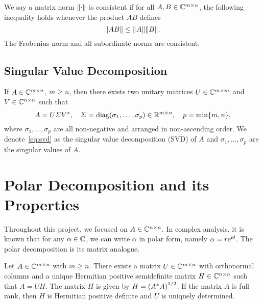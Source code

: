 \documentclass[12pt]{article}
\begin{document}
We say a matrix norm $\|{\cdot}\|$ is consistent if for all $A,B\in\mathbb{C}^{m\times n}$, the following inequality holds whenever the product $AB$ defines 
\begin{equation}
    \notag 
    \|{AB}\| \leq \|{A}\|\|{B}\|.
\end{equation}
The Frobenius norm and all subordinate norms are consistent.

\subsection{Singular Value Decomposition}\label{subsec:svd}
\begin{theorem}
    \label{thm:svd}
    If $A\in\mathbb{C}^{m\times n}$, $m\geq n$, then there exists two unitary matrices $U\in\mathbb{C}^{m\times m}$ and $V\in\mathbb{C}^{n\times n}$ such that 
    \begin{equation}\label{eq:svd}
        A = U\varSigma V^*,\quad \varSigma = \mathrm{diag}(\sigma_1,\dots,\sigma_p)\in\mathbb{R}^{m\times n},\quad p = \min\{m,n\},
    \end{equation}
    where $\sigma_1,\dots,\sigma_p$ are all non-negative and arranged in non-ascending order. We denote~\eqref{eq:svd} as the singular value decomposition (SVD) of $A$ and $\sigma_1,\dots,\sigma_p$ are the singular values of $A$.
\end{theorem}





\section{Polar Decomposition and its Properties}\label{sec:polar-properties}

Throughout this project, we focused on $A\in\mathbb{C}^{n\times n}$. In complex analysis, it is known that for any $\alpha\in\mathbb{C}$, we can write $\alpha$ in polar form, namely $\alpha = r\mathrm{e}^{\mathrm{i} \theta}$. The polar decomposition is its matrix analogue.

\begin{theorem}
     \label{def:matrix-norm}
    Let $A\in\mathbb{C}^{m\times n}$ with $m \geq n$. There exists a matrix $U\in\mathbb{C}^{m\times n}$ with orthonormal columns and a unique Hermitian positive semidefinite matrix $H\in\mathbb{C}^{n\times n}$ such that $A = UH$. The matrix $H$ is given by $H = \left(A^* A\right)^{1/2}$. If the matrix $A$ is full rank, then $H$ is Hermitian positive definite and $U$ is uniquely determined.
\end{theorem}
\end{document}
